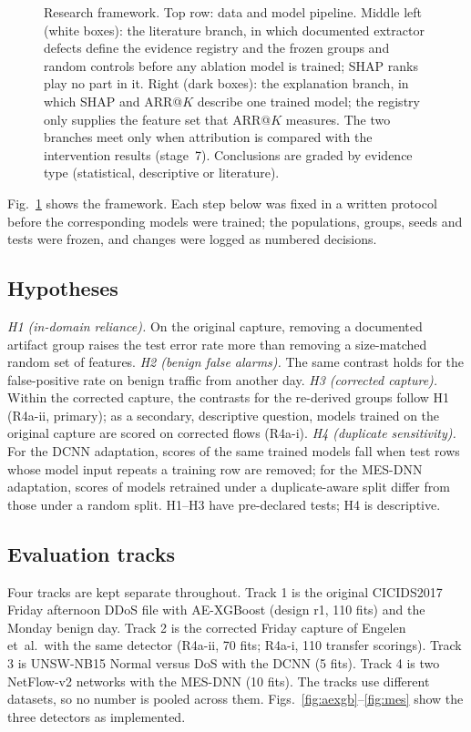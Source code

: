 \documentclass[journal]{IEEEtran}
\begin{document}
\begin{figure}[!t]
\centering
\resizebox{\textwidth}{!}{}
\caption{Research framework. Top row: data and model pipeline. Middle left (white boxes): the
literature branch, in which documented extractor defects define the evidence registry and the
frozen groups and random controls before any ablation model is trained; SHAP ranks play no part
in it. Right (dark boxes): the explanation branch, in which SHAP and ARR@$K$ describe one trained
model; the registry only supplies the feature set that ARR@$K$ measures. The two branches meet
only when attribution is compared with the intervention results (stage~7). Conclusions are graded
by evidence type (statistical, descriptive or literature).}
\label{fig:framework}
\end{figure}

Fig.~\ref{fig:framework} shows the framework. Each step below was fixed in a written protocol
before the corresponding models were trained; the populations, groups, seeds and tests were
frozen, and changes were logged as numbered decisions.

\subsection{Hypotheses}
\textit{H1 (in-domain reliance).} On the original capture, removing a documented artifact group
raises the test error rate more than removing a size-matched random set of features.
\textit{H2 (benign false alarms).} The same contrast holds for the false-positive rate on benign
traffic from another day. \textit{H3 (corrected capture).} Within the corrected capture, the
contrasts for the re-derived groups follow H1 (R4a-ii, primary); as a secondary, descriptive
question, models trained on the original capture are scored on corrected flows (R4a-i).
\textit{H4 (duplicate sensitivity).} For the DCNN adaptation, scores of the same trained models fall
when test rows whose model input repeats a training row are removed; for the MES-DNN adaptation,
scores of models retrained under a duplicate-aware split differ from those under a random split.
H1--H3 have pre-declared tests; H4 is descriptive.

\subsection{Evaluation tracks}
Four tracks are kept separate throughout. Track 1 is the original CICIDS2017 Friday afternoon
DDoS file with AE-XGBoost (design r1, 110 fits) and the Monday benign day. Track 2 is the
corrected Friday capture of Engelen et~al.\ with the same detector (R4a-ii, 70 fits; R4a-i, 110
transfer scorings). Track 3 is UNSW-NB15 Normal versus DoS with the DCNN (5 fits). Track 4 is
two NetFlow-v2 networks with the MES-DNN (10 fits). The tracks use different datasets, so no
number is pooled across them. %
Figs.~\ref{fig:aexgb}--\ref{fig:mes} show the three detectors as implemented.
\end{document}
